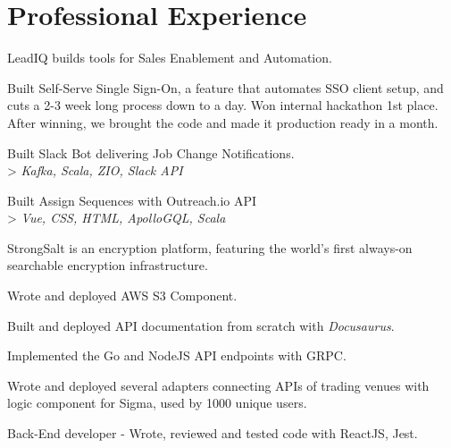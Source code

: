 \documentclass[]{deedy-resume-openfont}
\begin{document}
\begin{minipage}[t]{0.66\textwidth} 


\section{Professional Experience}
\vspace{\topsep} %
\begin{tightemize}
\item LeadIQ builds tools for Sales Enablement and Automation.
\item Built Self-Serve Single Sign-On, a feature that automates SSO client setup, and cuts a 2-3 week long process down to a day. 
Won internal hackathon 1st place. After winning, we brought the code and made it production ready in a month.
\item Built Slack Bot delivering Job Change Notifications. \\ > \emph{Kafka, Scala, ZIO, Slack API}
\item Built Assign Sequences with Outreach.io API \\ > \emph{Vue, CSS, HTML, ApolloGQL, Scala}
\end{tightemize}
\sectionsep
{}
\vspace{\topsep} %
\begin{tightemize}
\item StrongSalt is an encryption platform, featuring the world’s first always-on searchable encryption infrastructure.
\item Wrote and deployed AWS S3 Component.
\item Built and deployed API documentation from scratch with \textit{Docusaurus}.
\item Implemented the Go and NodeJS API endpoints with GRPC.
\end{tightemize}
\sectionsep
{}
\vspace{\topsep} %
\begin{tightemize}
\item Wrote and deployed several adapters connecting APIs of trading venues with logic component for Sigma, used by 1000 unique users.
\item Back-End developer - Wrote, reviewed and tested code with ReactJS, Jest.
\end{tightemize}
\sectionsep


\end{minipage}
\end{document}
